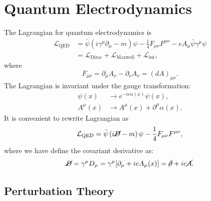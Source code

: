 \chapter{Quantum Electrodynamics}

The Lagrangian for quantum electrodynamics is
\begin{equation}
\begin{aligned}
	\mathcal{L}_{\mathrm{QED}}
	&= \bar\psi \left(i\gamma^\mu \partial_\mu - m\right)\psi - \frac{1}{4}F_{\mu\nu}F^{\mu\nu} -eA_\mu \bar\psi\gamma^\mu  \psi \\
	&= \mathcal{L}_{\mathrm{Dirac}}+\mathcal{L}_{\mathrm{Maxwell}}+\mathcal{L}_{\mathrm{int}},
\end{aligned}
\end{equation}
where
\begin{equation}
	F_{\mu\nu} = \partial_\mu A_\nu - \partial_\nu A_\nu = (dA)_{\mu\nu}.
\end{equation}
The Lagrangian is invariant under the gauge transformation:
\begin{equation}
\begin{aligned}
	\psi(x) &\rightarrow e^{-ie\alpha(x)}\psi(x), \\
	A^\mu(x) &\rightarrow A^\mu(x) + \partial^\mu \alpha(x).
\end{aligned}
\end{equation}
It is convenient to rewrite Lagrangian as
\begin{equation}
	\mathcal{L}_{\mathrm{QED}}
	= \bar\psi \left(i\cancel{D} - m\right)\psi - \frac{1}{4}F_{\mu\nu}F^{\mu\nu},
\end{equation}
where we have define the covariant derivative as:
\begin{equation}
	\cancel{D} = \gamma^\mu D_\mu 
	= \gamma^\mu [\partial_\mu + i e A_\mu(x)]
	= \cancel{\partial} + ie \cancel{A}.
\end{equation}


\section{Perturbation Theory}


